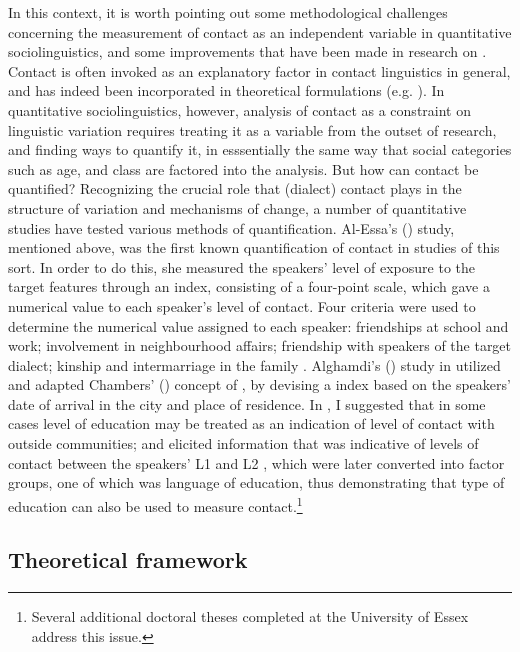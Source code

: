 \documentclass[output=paper]{langsci/langscibook}
\begin{document}
In this context, it is worth pointing out some methodological challenges concerning the measurement of contact as an independent variable in quantitative sociolinguistics, and some improvements that have been made in research on . Contact is often invoked as an explanatory factor in contact linguistics in general, and has indeed been incorporated in theoretical formulations (e.g. \citealt{ThomasonKaufman1988}). In quantitative sociolinguistics, however, analysis of contact as a constraint on linguistic variation requires treating it as a variable from the outset of research, and finding ways to quantify it, in esssentially the same way that social categories such as age,  and class are factored into the analysis. But how can contact be quantified? Recognizing the crucial role that (dialect) contact plays in the structure of variation and mechanisms of change, a number of quantitative studies have tested various methods of quantification. Al-Essa's (\citeyear{Al-Essa2009}) study, mentioned above, was the first known quantification of contact in studies of this sort. In order to do this, she measured the speakers’ level of exposure to the target features through an index, consisting of a four-point scale, which gave a numerical value to each speaker’s level of contact. Four criteria were used to determine the numerical value assigned to each speaker: friendships at school and work; involvement in neighbourhood affairs; friendship with speakers of the target dialect; kinship and intermarriage in the family \citep[208]{Al-Essa2009}. Alghamdi's (\citeyear{Alghamdi2014}) study in  utilized and adapted Chambers' (\citeyear{Chambers2000}) concept of , by devising a  index based on the speakers’ date of arrival in the city and place of residence. In \citet{Al-Wer2002}, I suggested that in some cases level of education may be treated as an indication of level of contact with outside communities; and \citet{Horesh2014} elicited information that was indicative of levels of contact between the speakers’ L1  and L2 , which were later converted into factor groups, one of which was language of education, thus demonstrating that type of education can also be used to measure contact.\footnote{Several additional doctoral theses completed at the University of Essex address this issue.}

\subsection{Theoretical framework}
\end{document}
